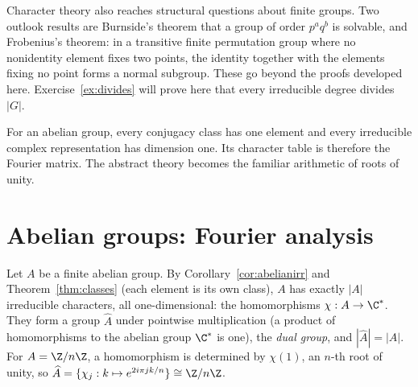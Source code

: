 \begin{remark}
Character theory also reaches structural questions about finite groups. Two
outlook results are Burnside's theorem that a group of order $p^aq^b$ is
solvable, and Frobenius's theorem: in a transitive finite permutation group
where no nonidentity element fixes two points, the identity together with
the elements fixing no point forms a normal subgroup. These go beyond the
proofs developed here. Exercise~\ref{ex:divides} will prove here
that every irreducible degree divides $|G|$.
\end{remark}

For an abelian group, every conjugacy class has one element and every irreducible complex representation has dimension one. Its character table is therefore the Fourier matrix. The abstract theory becomes the familiar arithmetic of roots of unity.

\section{Abelian groups: Fourier analysis}\label{sec:fourierab}

Let $A$ be a finite abelian group. By Corollary~\ref{cor:abelianirr} and Theorem~\ref{thm:classes} (each element is its own class), $A$ has exactly $|A|$ irreducible characters, all one-dimensional: the homomorphisms $\chi:A\to\C^*$. They form a group $\widehat A$ under pointwise multiplication (a product of homomorphisms to the abelian group $\C^*$ is one), the \emph{dual group}, and $|\widehat A|=|A|$. For $A=\Z/n\Z$, a homomorphism is determined by $\chi(1)$, an $n$-th root of unity, so $\widehat A=\{\chi_j:k\mapsto e^{2i\pi jk/n}\}\cong\Z/n\Z$.

